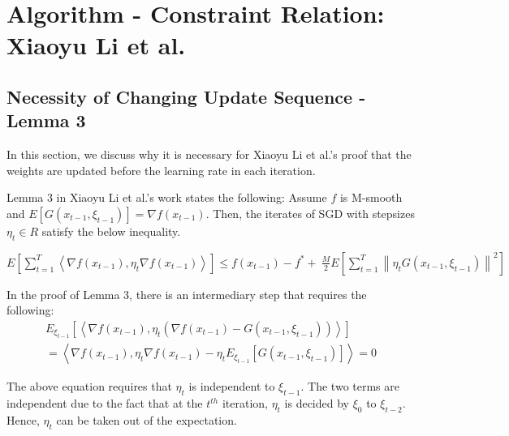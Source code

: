 \documentclass[14pt,onecolumn,letterpaper]{extarticle}
\begin{document}
\section{Algorithm - Constraint Relation: Xiaoyu Li et al.}
\subsection{Necessity of Changing Update Sequence - Lemma 3}
In this section, we discuss why it is necessary for Xiaoyu Li et al.'s proof that the weights are updated before the learning rate in each iteration. \par
Lemma 3 in Xiaoyu Li et al.'s work states the following: Assume $f$ is M-smooth and $E[G(x_{t-1},\xi_{t-1})]=\nabla f(x_{t-1})$. 
Then, the iterates of SGD with stepsizes $\eta_t \in R$ satisfy the below inequality.
\par\vspace{3mm}
$E\left[\sum_{t=1}^T\left\langle\nabla f\left(x_{t-1}\right), \eta_t \nabla f\left(x_{t-1}\right)\right\rangle\right] \leq f\left(x_{t-1}\right)-f^*  +\ \frac{M}{2} E\left[\sum_{t=1}^T\left\|\eta_t G\left(x_{t-1}, \xi_{t-1}\right)\right\|^2\right]$
\par\vspace{3mm}
In the proof of Lemma 3, there is an intermediary step that requires the following:
\begin{align*}
    E_{\xi_{t-1}}\left[\left\langle\nabla f\left(x_{t-1}\right), \eta_t\left(\nabla f\left(x_{t-1}\right)-G\left(x_{t-1}, \xi_{t-1}\right)\right)\right\rangle\right]\\
    =\left\langle\nabla f\left(x_{t-1}\right), \eta_t \nabla f\left(x_{t-1}\right)-\eta_t E_{\xi_{t-1}}\left[G\left(x_{t-1}, \xi_{t-1}\right)\right]\right\rangle=0
\end{align*}

The above equation requires that $\eta_t$ is independent to $\xi_{t-1}$. The two terms are independent due to the fact that at the $t^{th}$ iteration, $\eta_t$ is decided by $\xi_0$ to $\xi_{t-2}$. Hence, $\eta_t$ can be taken out of the expectation.
\end{document}

